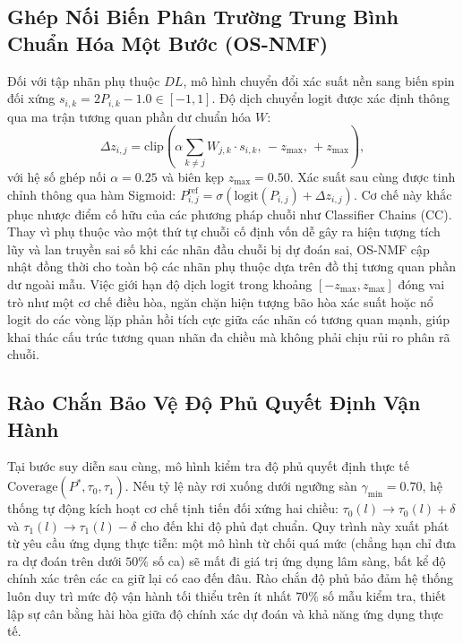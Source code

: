 \documentclass[10pt,a4paper,twoside]{article}
\begin{document}
\subsection{Ghép Nối Biến Phân Trường Trung Bình Chuẩn Hóa Một Bước (OS-NMF)}
Đối với tập nhãn phụ thuộc $DL$, mô hình chuyển đổi xác suất nền sang biến spin đối xứng $s_{i, k} = 2P_{i, k} - 1.0 \in [-1, 1]$. Độ dịch chuyển logit được xác định thông qua ma trận tương quan phần dư chuẩn hóa $W$:
\begin{equation}
\Delta z_{i, j} = \text{clip}\left(\alpha \sum_{k \neq j} W_{j, k} \cdot s_{i, k}, \, -z_{\max}, \, +z_{\max}\right),
\end{equation}
với hệ số ghép nối $\alpha = 0.25$ và biên kẹp $z_{\max} = 0.50$. Xác suất sau cùng được tinh chỉnh thông qua hàm Sigmoid: $P_{i, j}^{\text{ref}} = \sigma\left(\text{logit}(P_{i, j}) + \Delta z_{i, j}\right)$.
Cơ chế này khắc phục nhược điểm cố hữu của các phương pháp chuỗi như Classifier Chains (CC). Thay vì phụ thuộc vào một thứ tự chuỗi cố định vốn dễ gây ra hiện tượng tích lũy và lan truyền sai số khi các nhãn đầu chuỗi bị dự đoán sai, OS-NMF cập nhật đồng thời cho toàn bộ các nhãn phụ thuộc dựa trên đồ thị tương quan phần dư ngoài mẫu. Việc giới hạn độ dịch logit trong khoảng $[-z_{\max}, z_{\max}]$ đóng vai trò như một cơ chế điều hòa, ngăn chặn hiện tượng bão hòa xác suất hoặc nổ logit do các vòng lặp phản hồi tích cực giữa các nhãn có tương quan mạnh, giúp khai thác cấu trúc tương quan nhãn đa chiều mà không phải chịu rủi ro phân rã chuỗi.

\subsection{Rào Chắn Bảo Vệ Độ Phủ Quyết Định Vận Hành}
Tại bước suy diễn sau cùng, mô hình kiểm tra độ phủ quyết định thực tế $\text{Coverage}(P^*, \tau_0, \tau_1)$. Nếu tỷ lệ này rơi xuống dưới ngưỡng sàn $\gamma_{\min} = 0.70$, hệ thống tự động kích hoạt cơ chế tịnh tiến đối xứng hai chiều: $\tau_0(l) \to \tau_0(l) + \delta$ và $\tau_1(l) \to \tau_1(l) - \delta$ cho đến khi độ phủ đạt chuẩn.
Quy trình này xuất phát từ yêu cầu ứng dụng thực tiễn: một mô hình từ chối quá mức (chẳng hạn chỉ đưa ra dự đoán trên dưới $50\%$ số ca) sẽ mất đi giá trị ứng dụng lâm sàng, bất kể độ chính xác trên các ca giữ lại có cao đến đâu. Rào chắn độ phủ bảo đảm hệ thống luôn duy trì mức độ vận hành tối thiểu trên ít nhất $70\%$ số mẫu kiểm tra, thiết lập sự cân bằng hài hòa giữa độ chính xác dự đoán và khả năng ứng dụng thực tế.
\end{document}
